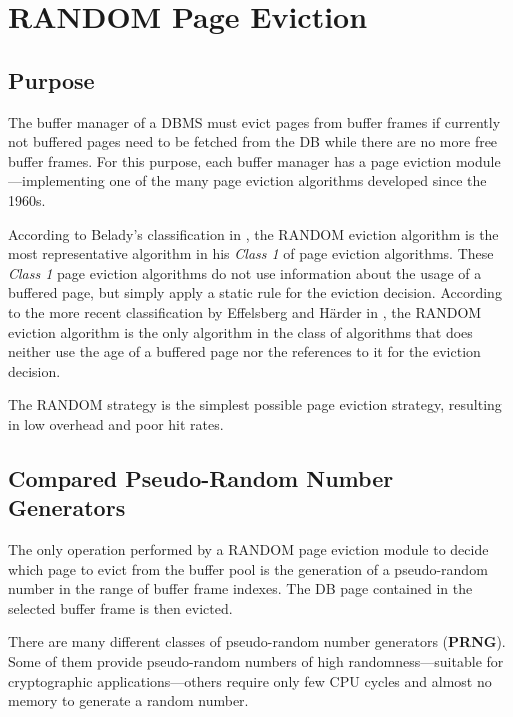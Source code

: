\chapter[RANDOM Page Eviction]{RANDOM Page Eviction} \label{ch:random}

\section[Purpose]{Purpose}

    The buffer manager of a DBMS must evict pages from buffer frames if currently not buffered pages need to be fetched from the DB while there are no more free buffer frames. For this purpose, each buffer manager has a page eviction module---implementing one of the many page eviction algorithms developed since the 1960s.

    According to Belady's classification in \cite{Belady:1966}, the RANDOM eviction algorithm is the most representative algorithm in his \textit{Class 1} of page eviction algorithms. These \textit{Class 1} page eviction algorithms do not use information about the usage of a buffered page, but simply apply a static rule for the eviction decision. According to the more recent classification by Effelsberg and Härder in \cite{Effelsberg:1984}, the RANDOM eviction algorithm is the only algorithm in the class of algorithms that does neither use the age of a buffered page nor the references to it for the eviction decision.

    The RANDOM strategy is the simplest possible page eviction strategy, resulting in low overhead and poor hit rates.

\section[Compared Pseudo-Random Number Generators]{Compared Pseudo-Random Number Generators}

    The only operation performed by a RANDOM page eviction module to decide which page to evict from the buffer pool is the generation of a pseudo-random number in the range of buffer frame indexes. The DB page contained in the selected buffer frame is then evicted.

    There are many different classes of pseudo-random number generators (\textbf{PRNG}). Some of them provide pseudo-random numbers of high randomness---suitable for cryptographic applications---others require only few CPU cycles and almost no memory to generate a random number.

